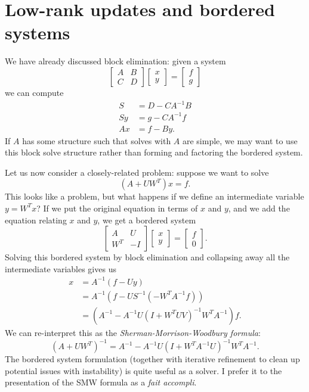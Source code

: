 \section{Low-rank updates and bordered systems}

We have already discussed block elimination: given a system
\[
  \begin{bmatrix} A & B \\ C & D \end{bmatrix}
  \begin{bmatrix} x \\ y \end{bmatrix} =
  \begin{bmatrix} f \\ g \end{bmatrix}
\]
we can compute
\begin{align*}
  S &= D-C A^{-1} B \\
  S y &= g-C A^{-1} f \\
  A x &= f-By.
\end{align*}
If $A$ has some structure such that solves with $A$ are simple,
we may want to use this block solve structure rather than
forming and factoring the bordered system.

Let us now consider a closely-related problem: suppose we want
to solve
\[
  (A+UW^T) x = f.
\]
This looks like a problem, but what happens if we define an
intermediate variable $y = W^T x$?  If we put the original
equation in terms of $x$ and $y$, and we add the equation
relating $x$ and $y$, we get a bordered system
\[
  \begin{bmatrix} A & U \\ W^T & -I \end{bmatrix}
  \begin{bmatrix} x \\ y \end{bmatrix} =
  \begin{bmatrix} f \\ 0 \end{bmatrix}.
\]
Solving this bordered system by block elimination and
collapsing away all the intermediate variables gives us
\begin{align*}
  x &= A^{-1} \left( f - U y \right) \\
    &= A^{-1} \left( f - U S^{-1} (-W^T A^{-1} f) \right) \\
    &= \left( A^{-1} - A^{-1} U (I+W^T U V)^{-1} W^T A^{-1} \right) f.
\end{align*}
We can re-interpret this as the {\em Sherman-Morrison-Woodbury formula}:
\[
  (A+UW^T)^{-1} = A^{-1} - A^{-1} U (I+W^T A^{-1} U)^{-1} W^T A^{-1}.
\]
The bordered system formulation (together with iterative refinement
to clean up potential issues with instability) is quite useful as a
solver.  I prefer it to the presentation of the SMW formula as a
{\em fait accompli}.
